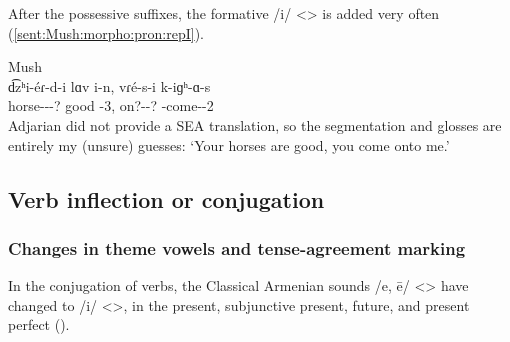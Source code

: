 After the possessive suffixes, the formative /i/ <> is added very often (\ref{sent:Mush:morpho:pron:repI}).

\begin{exe}
	\ex Mush \label{sent:Mush:morpho:pron:repI} \\ \gll 
	d͡zʰi-\'eɾ-d-i lɑv i-n, vɾ\'e-s-i k-iɡʰ-ɑ-s
	\\
	horse-{\pl}-{\possSsg}-? good {\aux}-3{\pl}, on?-{\possFsg}-? {\ind}-come-{\thgloss}-2{\sg}\\
	 \trans Adjarian did not provide a SEA translation, so the segmentation and glosses are entirely my (unsure) guesses: `Your horses are good, you come onto me.' \\
\end{exe}

\subsection{Verb inflection or conjugation}

\subsubsection{Changes in theme vowels and tense-agreement marking}
In the conjugation of verbs, the Classical Armenian sounds /e, ē/ <> have changed to /i/ <>, in the present, subjunctive present, future, and present perfect (). 


